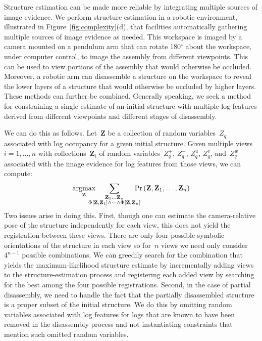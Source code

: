Structure estimation can be made more reliable by integrating multiple sources
of image evidence.
%
We perform structure estimation in a robotic environment, illustrated in
Figure~\ref{fig:complexity}(d), that facilities automatically gathering
multiple sources of image evidence as needed.
%
This workspace is imaged by a camera mounted on a pendulum arm that can rotate
180$^{\circ}$ about the workspace, under computer control, to image the
assembly from different viewpoints.
%
This can be used to view portions of the assembly that would otherwise be
occluded.
%
Moreover, a robotic arm can disassemble a structure on the workspace to reveal
the lower layers of a structure that would otherwise be occluded by higher
layers.
%
These methods can further be combined.
%
Generally speaking, we seek a method for constraining a single estimate
of an initial structure with multiple log features derived from different
viewpoints and different stages of disassembly.

We can do this as follows.
%
Let~$\mathbf{Z}$ be a collection of random variables~$Z_q$ associated with log
occupancy for a given initial structure.
%
Given multiple views $i=1,\ldots,n$ with collections~$\mathbf{Z}_i$ of random
variables~$Z^+_q$, $Z^-_q$, $Z^u_q$, $Z^v_q$, and~$Z^w_q$ associated with the
image evidence for log features from those views, we can compute:
%
\begin{equation*}
  \argmax_{\mathbf{Z}}\hspace{-12pt}
  \sum_{\substack{\mathbf{Z}_1\ldots\mathbf{Z}_n\\
      \Phi\left[\mathbf{Z},\mathbf{Z}_1\right]\wedge\cdots\wedge\Phi\left[\mathbf{Z},\mathbf{Z}_n\right]}}
  \hspace{-10pt}\Pr\left(\mathbf{Z},\mathbf{Z}_1,\ldots,\mathbf{Z}_n\right)
\end{equation*}
%
Two issues arise in doing this.
%
First, though one can estimate the camera-relative pose of the structure
independently for each view, this does not yield the registration between these
views.
%
There are only four possible symbolic orientations of the structure in each
view so for~$n$ views we need only consider~$4^{n-1}$ possible combinations.
%
We can greedily search for the combination that yields the maximum-likelihood
structure estimate by incrementally adding views to the structure-estimation
process and registering each added view by searching for the best among the
four possible registrations.
%
Second, in the case of partial disassembly, we need to handle the fact that the
partially disassembled structure is a proper subset of the initial structure.
%
We do this by omitting random variables associated with log features
for logs that are known to have been removed in the disassembly process and not
instantiating constraints that mention such omitted random variables.


